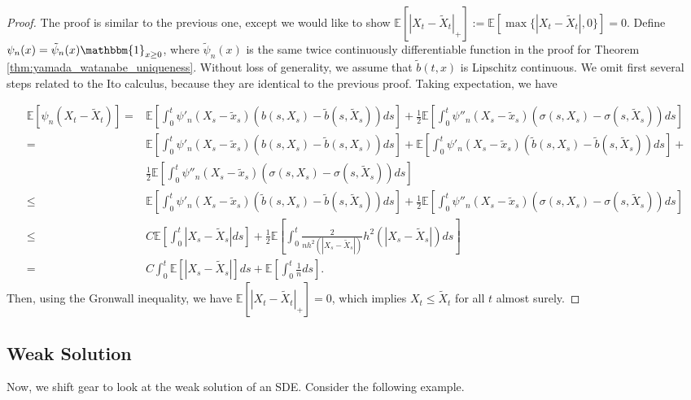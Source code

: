 \documentclass{article}
\begin{document}
\begin{proof}
The proof is similar to the previous one, except we would like to show $\mathbb{E}[|X_t-\tilde{X}_t|_+]:=\mathbb{E}[\max\{|X_t-\tilde{X}_t|,0\}]=0$. Define $\psi_n(x)=\tilde{\psi}_n(x)\mathbbm{1}_{x\geq0}$, where $\tilde{\psi}_n(x)$ is the same twice continuously differentiable function in the proof for Theorem \ref{thm:yamada_watanabe_uniqueness}. Without loss of generality, we assume that $\tilde{b}(t,x)$ is Lipschitz continuous. We omit first several steps related to the Ito calculus, because they are identical to the previous proof. Taking expectation, we have

\begin{equation*}
\begin{aligned}
\mathbb{E}[\psi_n(X_t-\tilde{X}_t)]=&\mathbb{E}[\int^t_0\psi'_n(X_s-\tilde{x}_s)(b(s,X_s)-\tilde{b}(s,\tilde{X}_s))ds]+\frac{1}{2}\mathbb{E}[\int^t_0\psi''_n(X_s-\tilde{x}_s)(\sigma(s,X_s)-\sigma(s,\tilde{X}_s))ds]\\
=&\mathbb{E}[\int^t_0\psi'_n(X_s-\tilde{x}_s)(b(s,X_s)-\tilde{b}(s,X_s))ds]+\mathbb{E}[\int^t_0\psi'_n(X_s-\tilde{x}_s)(\tilde{b}(s,X_s)-\tilde{b}(s,\tilde{X}_s))ds]+\\
&\frac{1}{2}\mathbb{E}[\int^t_0\psi''_n(X_s-\tilde{x}_s)(\sigma(s,X_s)-\sigma(s,\tilde{X}_s))ds]\\
\leq&\mathbb{E}[\int^t_0\psi'_n(X_s-\tilde{x}_s)(\tilde{b}(s,X_s)-\tilde{b}(s,\tilde{X}_s))ds]+\frac{1}{2}\mathbb{E}[\int^t_0\psi''_n(X_s-\tilde{x}_s)(\sigma(s,X_s)-\sigma(s,\tilde{X}_s))ds]\\
\leq&C\mathbb{E}[\int^t_0|X_s-\tilde{X}_s|ds]+\frac{1}{2}\mathbb{E}[\int^t_0\frac{2}{nh^2(|X_s-\tilde{X}_s|)}h^2(|X_s-\tilde{X}_s|)ds]\\
=&C\int^t_0\mathbb{E}[|X_s-\tilde{X}_s|]ds+\mathbb{E}[\int^t_0\frac{1}{n}ds].
\end{aligned}
\end{equation*}
Then, using the Gronwall inequality, we have $\mathbb{E}[|X_t-\tilde{X}_t|_+]=0$, which implies $X_t\leq\tilde{X}_t$ for all $t$ almost surely. 
\end{proof}

\subsection{Weak Solution}
Now, we shift gear to look at the weak solution of an SDE. Consider the following example.
\end{document}
